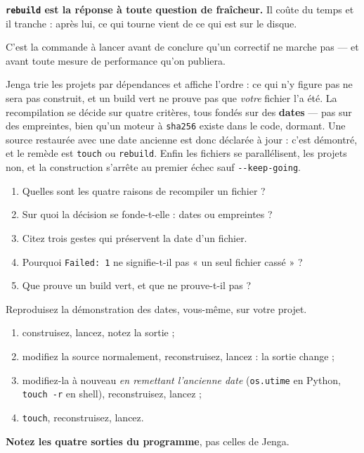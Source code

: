 \begin{nkretenir}
\textbf{\texttt{rebuild} est la réponse à toute question de fraîcheur.} Il coûte
du temps et il tranche : après lui, ce qui tourne vient de ce qui est sur le
disque.

C'est la commande à lancer avant de conclure qu'un correctif ne marche pas --- et
avant toute mesure de performance qu'on publiera.
\end{nkretenir}

\begin{nkbilan}
Jenga trie les projets par dépendances et affiche l'ordre : ce qui n'y figure pas
ne sera pas construit, et un build vert ne prouve pas que \emph{votre} fichier
l'a été. La recompilation se décide sur quatre critères, tous fondés sur des
\textbf{dates} --- pas sur des empreintes, bien qu'un moteur à \texttt{sha256}
existe dans le code, dormant. Une source restaurée avec une date ancienne est
donc déclarée à jour : c'est démontré, et le remède est \texttt{touch} ou
\texttt{rebuild}. Enfin les fichiers se parallélisent, les projets non, et la
construction s'arrête au premier échec sauf \texttt{-{}-keep-going}.
\end{nkbilan}

\begin{nkquestions}
\begin{enumerate}
\item Quelles sont les quatre raisons de recompiler un fichier ?
\item Sur quoi la décision se fonde-t-elle : dates ou empreintes ?
\item Citez trois gestes qui préservent la date d'un fichier.
\item Pourquoi \texttt{Failed: 1} ne signifie-t-il pas « un seul fichier cassé » ?
\item Que prouve un build vert, et que ne prouve-t-il pas ?
\end{enumerate}
\end{nkquestions}

\begin{nkpratique}
Reproduisez la démonstration des dates, vous-même, sur votre projet.

\begin{enumerate}
\item construisez, lancez, notez la sortie ;
\item modifiez la source normalement, reconstruisez, lancez : la sortie change ;
\item modifiez-la à nouveau \emph{en remettant l'ancienne date}
      (\texttt{os.utime} en Python, \texttt{touch -r} en shell), reconstruisez,
      lancez ;
\item \texttt{touch}, reconstruisez, lancez.
\end{enumerate}

\textbf{Notez les quatre sorties du programme}, pas celles de Jenga.
\end{nkpratique}

